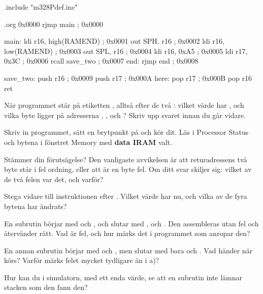 \begin{asmcode}
.include "m328Pdef.inc"

.org 0x0000
    rjmp main                       ; 0x0000

main:
    ldi r16, high(RAMEND)           ; 0x0001
    out SPH, r16                    ; 0x0002
    ldi r16, low(RAMEND)            ; 0x0003
    out SPL, r16                    ; 0x0004
    ldi r16, 0xA5                   ; 0x0005
    ldi r17, 0x3C                   ; 0x0006
    rcall save_two                  ; 0x0007
end:
    rjmp end                        ; 0x0008

save_two:
    push r16                        ; 0x0009
    push r17                        ; 0x000A
here:
    pop r17                         ; 0x000B
    pop r16
    ret
\end{asmcode}

När programmet står på etiketten , alltså efter de två : vilket värde har
, och vilka byte ligger på adresserna , ,  och
? Skriv upp svaret innan du går vidare.

Skriv in programmet, sätt en brytpunkt på  och kör dit. Läs  i Processor
Status och bytena i fönstret Memory med \textbf{data IRAM} valt.

Stämmer din förutsägelse? Den vanligaste avvikelsen är att returadressens två byte står i fel
ordning, eller att  är en byte fel. Om ditt svar skiljer sig: vilket av de två felen var
det, och varför?

Stega vidare till instruktionen efter . Vilket värde har  nu, och vilka av de
fyra bytena har ändrats?

\label{c10:ex:12}
\begin{parts}
  \item En subrutin börjar med  och , och slutar med ,
     och . Den assembleras utan fel och återvänder rätt. Vad är fel, och hur
    märks det i programmet som anropar den?
  \item En annan subrutin börjar med  och , men slutar med bara
     och . Vad händer när  körs? Varför märks felet mycket
    tydligare än i a)?
  \item Hur kan du i simulatorn, med ett enda värde, se att en subrutin inte lämnar stacken som den
    fann den?
\end{parts}

